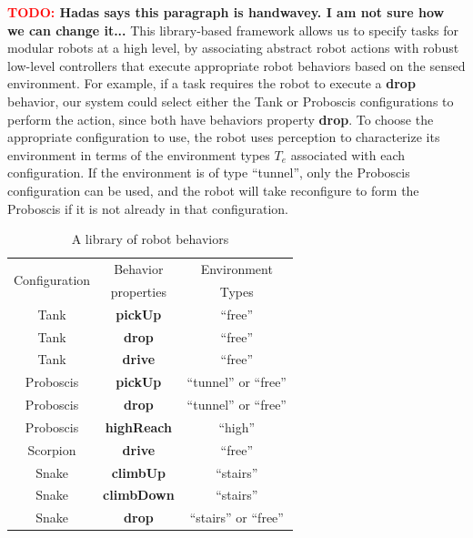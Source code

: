 \documentclass[journal]{IEEEtran}
\newcommand{\TODO}[1]{ {\bf \textcolor{red}{TODO:} #1 }}
\begin{document}
\TODO{Hadas says this paragraph is handwavey. I am not sure how we can change it...}This library-based framework allows us to specify tasks for modular robots at a high level, by associating abstract robot actions with robust low-level controllers that execute appropriate robot behaviors based on the sensed environment.
For example, if a task requires the robot to execute a \textbf{drop} behavior, our system could select either the Tank or Proboscis configurations to perform the action, since both have behaviors property \textbf{drop}. To choose the appropriate configuration to use, the robot uses perception to characterize its environment in terms of the environment types $T_e$ associated with each configuration. If the environment is of type ``tunnel'', only the Proboscis configuration can be used, and the robot will take reconfigure to form the Proboscis if it is not already in that configuration. 
%
\begin{table}
\centering
\begin{tabular}{ |c|c|c| } 
 \hline
 \multirow{2}{6em}{Configuration} & Behavior & Environment \\
 & properties & Types \\
 \hline
 Tank & \textbf{pickUp} & ``free'' \\\hline
 Tank & \textbf{drop} & ``free'' \\\hline
 Tank & \textbf{drive} & ``free''\\ \hline
 Proboscis & \textbf{pickUp} & ``tunnel'' or ``free''\\ \hline
 Proboscis & \textbf{drop} &``tunnel'' or ``free'' \\ \hline
 Proboscis & \textbf{highReach} & ``high''\\ \hline
 Scorpion & \textbf{drive} & ``free''\\ \hline
 Snake & \textbf{climbUp} & ``stairs''\\ \hline
 Snake & \textbf{climbDown} & ``stairs''\\ \hline
 Snake & \textbf{drop} & ``stairs'' or ``free''\\
 \hline
\end{tabular}
\caption{A library of robot behaviors}
\label{table:1}
\vspace{-1em}
\end{table}
\end{document}
